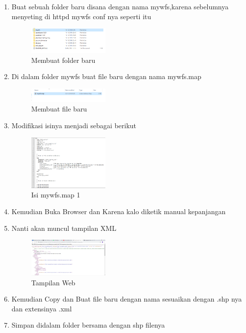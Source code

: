 \begin{enumerate}
  \item Buat sebuah folder baru disana dengan nama mywfs,karena sebelumnya menyeting di httpd mywfs conf nya seperti itu
  \hfill\break
    \begin{figure}[H]
		\includegraphics[width=4cm]{figures/Tugas4/1174089/15.png}
		\centering
		\caption{Membuat folder baru}
    \end{figure}
  \item Di dalam folder mywfs buat file baru dengan nama mywfs.map
  \hfill\break
    \begin{figure}[H]
		\includegraphics[width=4cm]{figures/Tugas4/1174089/16.png}
		\centering
		\caption{Membuat file baru}
    \end{figure}
  \item Modifikasi isinya menjadi sebagai berikut
  \hfill\break
    \begin{figure}[H]
		\includegraphics[width=4cm]{figures/Tugas4/1174089/17.png}
		\centering
		\caption{Isi mywfs.map 1}
    \end{figure}
  \item Kemudian Buka Browser dan Karena kalo diketik manual kepanjangan
  \item Nanti akan muncul tampilan XML
  \hfill\break
    \begin{figure}[H]
		\includegraphics[width=4cm]{figures/Tugas4/1174089/18.png}
		\centering
		\caption{Tampilan Web}
    \end{figure}
  \item Kemudian Copy dan Buat file baru dengan nama sesuaikan dengan .shp nya dan extensinya .xml
  \item Simpan didalam folder bersama dengan shp filenya

\end{enumerate}
